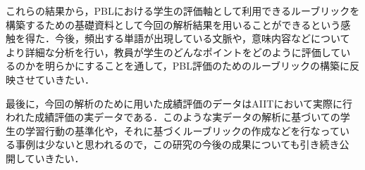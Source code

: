 \documentclass[submit]{ipsj}
\begin{document}
これらの結果から，PBLにおける学生の評価軸として利用できるルーブリックを
構築するための基礎資料として今回の解析結果を用いることができるという感
触を得た．今後，頻出する単語が出現している文脈や，意味内容などについて
より詳細な分析を行い，教員が学生のどんなポイントをどのように評価してい
るのかを明らかにすることを通して，PBL評価のためのルーブリックの構築に反
映させていきたい．

最後に，今回の解析のために用いた成績評価のデータはAIITにおいて実際に行
われた成績評価の実データである．このような実データの解析に基づいての学
生の学習行動の基準化や，それに基づくルーブリックの作成などを行なってい
る事例は少ないと思われるので，この研究の今後の成果についても引き続き公
開していきたい．



\end{document}

